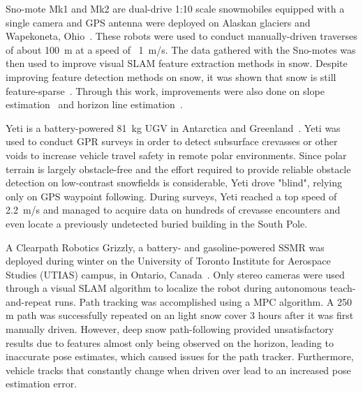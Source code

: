 Sno-mote Mk1 and Mk2 are dual-drive 1:10 scale snowmobiles equipped with a single camera and \ac{GPS} antenna were deployed on Alaskan glaciers and Wapekoneta, Ohio~\citep{Williams2009}.
These robots were used to conduct manually-driven traverses of about \SI{100}{m} at a speed of ~\SI{1}{m/s}.
The data gathered with the Sno-motes was then used to improve visual \ac{SLAM} feature extraction methods in snow. 
Despite improving feature detection methods on snow, it was shown that snow is still feature-sparse~\citep{Williams2009}.
Through this work, improvements were also done on slope estimation~\citep{Williams2010} and horizon line estimation~\citep{Williams2011}.

Yeti is a battery-powered \SI{81}{kg} \ac{UGV} in Antarctica and Greenland~\citep{Lever2013}. 
Yeti was used to conduct \ac{GPR} surveys in order to detect subsurface crevasses or other voids to increase vehicle travel safety in remote polar environments.
Since polar terrain is largely obstacle-free and the effort required to provide reliable obstacle detection on low-contrast snowfields is considerable, Yeti drove "blind", relying only on \ac{GPS} waypoint following.
During surveys, Yeti reached a top speed of \SI{2.2}{m/s} and managed to acquire data on hundreds of crevasse encounters and even locate a previously undetected buried building in the South Pole.

A Clearpath Robotics Grizzly, a battery- and gasoline-powered \ac{SSMR} was deployed during winter on the University of Toronto Institute for Aerospace Studies (UTIAS) campus, in Ontario, Canada~\citep{Paton2017}.
Only stereo cameras were used through a visual \ac{SLAM} algorithm to localize the robot during autonomous teach-and-repeat runs. 
Path tracking was accomplished using a \ac{MPC} algorithm.
A 250 m path was successfully repeated on an light snow cover 3 hours after it was first manually driven. 
However, deep snow path-following provided unsatisfactory results due to features almost only being observed on the horizon, leading to inaccurate pose estimates, which caused issues for the path tracker.
Furthermore, vehicle tracks that constantly change when driven over lead to an increased pose estimation error.

